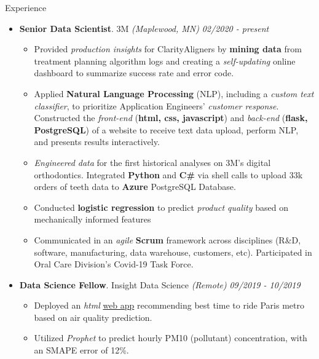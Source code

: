 \documentclass{resume} %
\begin{document}
	
	\begin{rSection}{Experience}
		
		\begin{itemize}[leftmargin=0em]
			
			\item {\bf Senior Data Scientist}{. 3M \textit{(Maplewood, MN)}} \hfill {\em 02/2020 - present}\\
			\vspace{-5mm}
			\begin{itemize}
				\setlength\itemsep{-1.75em}			
				\item Provided \textit{production insights} for Clarity\texttrademark Aligners by \textbf{mining data} from treatment planning algorithm logs and creating a 
				\textit{self-updating} online dashboard to summarize success rate and error code.\\
				\item Applied \textbf{Natural Language Processing} (NLP), including a \textit{custom text classifier}, to prioritize Application Engineers' \textit{customer response}. Constructed the \textit{front-end} (\textbf{html, css, javascript}) and \textit{back-end} (\textbf{flask, PostgreSQL}) of a website to receive text data upload, perform NLP, and presents results interactively.\\
				\item \textit{Engineered data} for the first historical analyses on 3M's digital orthodontics. Integrated \textbf{Python} and \textbf{C\#} via shell calls to upload 33k orders of teeth data to \textbf{Azure} PostgreSQL Database.\\
				\item Conducted \textbf{logistic regression} to predict \textit{product quality} based on mechanically informed features\\
				\item Communicated in an \textit{agile} \textbf{Scrum} framework across disciplines (R\&D, software, manufacturing, data warehouse, customers, etc). Participated in Oral Care Division's Covid-19 Task Force.\\
			\end{itemize}	
		
			\item {\bf Data Science Fellow}{. Insight Data Science \textit{(Remote)}} \hfill {\em 09/2019 - 10/2019}\\
			\vspace{-5mm}
			\begin{itemize}
				\setlength\itemsep{-1.75em}
				\item Deployed an \textit{html} \href{https://tinyurl.com/parispollute}{web app} recommending best time to ride Paris metro based on air quality prediction.\\
				\item Utilized \textit{Prophet} to predict hourly PM10 (pollutant) concentration, with an SMAPE error of 12\%.
			\end{itemize}	
			

\end{itemize}
\end{rSection}
\end{document}
